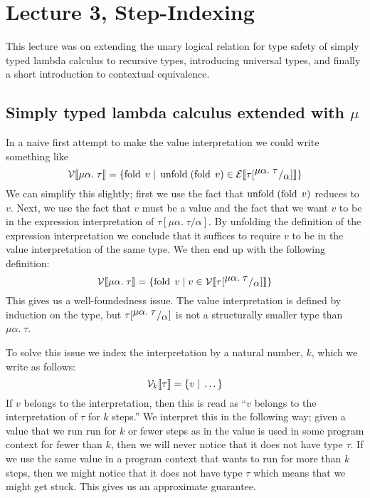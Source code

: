 \section*{Lecture 3, Step-Indexing}
This lecture was on extending the unary logical relation for type safety of simply typed lambda calculus to recursive types, introducing universal types, and finally a short introduction to contextual equivalence.

\subsection*{Simply typed lambda calculus extended with $\mu$}
In a naive first attempt to make the value interpretation we could write something like
\[
  \mathcal{V}\llbracket \mu\alpha. \; \tau \rrbracket = \{\operatorname{fold} \; v \; | \; \operatorname{unfold} \; (\operatorname{fold} \; v) \in \mathcal{E}\llbracket \tau[^{\textstyle \mu\alpha.\;\tau}/_{\textstyle \alpha}] \rrbracket \}
\]
We can simplify this slightly; first we use the fact that $\operatorname{unfold} \; (\operatorname{fold} \; v)$ reduces to $v$. Next, we use the fact that $v$ must be a value and the fact that we want $v$ to be in the expression interpretation of $\tau[\mu \alpha. \; \tau / \alpha]$. By unfolding the definition of the expression interpretation we conclude that it suffices to require $v$ to be in the value interpretation of the same type. We then end up with the following definition:
\[
  \mathcal{V}\llbracket \mu\alpha. \; \tau \rrbracket = \{\operatorname{fold} \; v \; | \; v \in \mathcal{V}\llbracket \tau[^{\textstyle \mu\alpha.\;\tau}/_{\textstyle \alpha}] \rrbracket \}
\]
This gives us a well-foundedness issue. The value interpretation is defined by induction on the type, but $\tau[^{\textstyle \mu\alpha.\;\tau}/_{\textstyle \alpha}]$ is not a structurally smaller type than $\mu\alpha. \; \tau$. 

To solve this issue we index the interpretation by a natural number, $k$, which we write as follows:
\[
  \mathcal{V}_{k}\llbracket \tau \rrbracket = \{v \; | \; \dots \}
\]
If $v$ belongs to the interpretation, then this is read as ``$v$ belongs to the interpretation of $\tau$ for $k$ steps.'' We interpret this in the following way; given a value that we run run for $k$ or fewer steps as in the value is used in some program context for fewer than $k$, then we will never notice that it does not have type $\tau$. If we use the same value in a program context that wants to run for more than $k$ steps, then we might notice that it does not have type $\tau$ which means that we might get stuck. This gives us an approximate guarantee.

